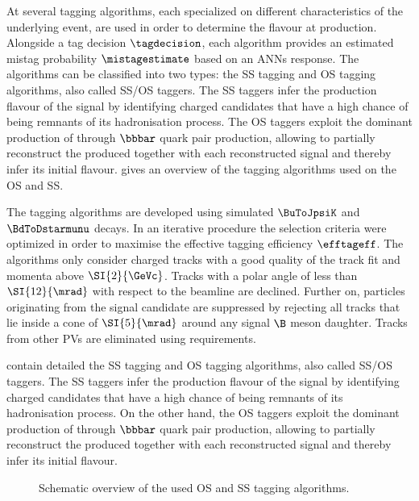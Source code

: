 At \LHCb several tagging algorithms, each specialized on different
characteristics of the underlying event, are used in order to determine the
\Bmeson flavour at production. Alongside a tag decision $\tagdecision$, each
algorithm provides an estimated mistag probability $\mistagestimate$ based on an
\acp{ANN} response. The algorithms can be classified into two types: the
\acf{SS} tagging and \acf{OS} tagging algorithms, also called \ac{SS}/\ac{OS}
taggers. The \ac{SS} taggers infer the production flavour of the signal \Bmeson
by identifying charged candidates that have a high chance of being remnants of
its hadronisation process. The \ac{OS} taggers exploit the dominant production
of \Bmesons through $\bbbar$ quark pair production, allowing to partially
reconstruct the \bhadron produced together with each reconstructed signal
\Bmeson and thereby infer its initial flavour.
 gives an overview of the tagging
algorithms used on the \acl{OS} and \acl{SS}.

The tagging algorithms are developed using simulated $\BuToJpsiK$ and
$\BdToDstarmunu$ decays. In an iterative procedure the selection criteria were
optimized in order to maximise the effective tagging efficiency $\efftageff$.
The algorithms only consider charged tracks with a good quality of the track fit
and momenta above $\SI{2}{\GeVc}$. Tracks with a polar angle of less than
$\SI{12}{\mrad}$ with respect to the beamline are declined. Further on,
particles originating from the signal candidate are suppressed by rejecting all
tracks that lie inside a cone of $\SI{5}{\mrad}$ around any signal $\B$ meson
daughter. Tracks from other \acp{PV} are eliminated using \IP requirements.

 contain detailed
the \ac{SS} tagging and \ac{OS} tagging algorithms, also called \ac{SS}/\ac{OS}
taggers. The \ac{SS} taggers infer the production flavour of the signal \Bmeson
by identifying charged candidates that have a high chance of being remnants of
its hadronisation process. On the other hand, the \ac{OS} taggers exploit the
dominant production of \Bmesons through $\bbbar$ quark pair production, allowing
to partially reconstruct the \bhadron produced together with each reconstructed
signal \Bmeson and thereby infer its initial flavour.
%
\begin{figure}
\centering

\caption{Schematic overview of the used \ac{OS} and \ac{SS} tagging
algorithms. \cite{wishahi:2013jt}}
\label{fig:flavour_tagging:lhcb:schematics}
\end{figure}

